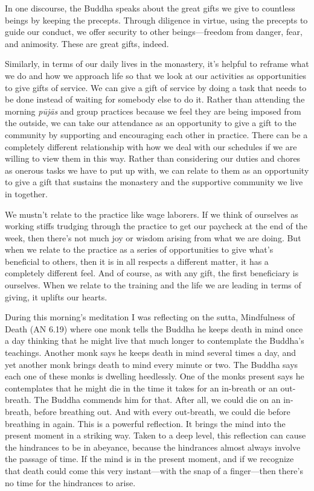
In one discourse, the Buddha speaks about the great gifts we give to 
countless beings by keeping the precepts. Through diligence in virtue, 
using the precepts to guide our conduct, we offer security to other 
beings---freedom from danger, fear, and animosity. These are great 
gifts, indeed.

Similarly, in terms of our daily lives in the monastery, it's helpful 
to reframe what we do and how we approach life so that we look at our 
activities as opportunities to give gifts of service. We can give a 
gift of service by doing a task that needs to be done instead of 
waiting for somebody else to do it. Rather than attending the morning 
\emph{pūjās} and group practices because we feel they are being 
imposed from the outside, we can take our attendance as an opportunity 
to give a gift to the community by supporting and encouraging each 
other in practice. There can be a completely different relationship 
with how we deal with our schedules if we are willing to view them in 
this way. Rather than considering our duties and chores as onerous 
tasks we have to put up with, we can relate to them as an opportunity 
to give a gift that sustains the monastery and the supportive community 
we live in together.

We mustn't relate to the practice like wage laborers. If we think of 
ourselves as working stiffs trudging through the practice to get our 
paycheck at the end of the week, then there's not much joy or wisdom 
arising from what we are doing. But when we relate to the practice as a 
series of opportunities to give what's beneficial to others, then it is 
in all respects a different matter, it has a completely different feel. 
And of course, as with any gift, the first beneficiary is ourselves. 
When we relate to the training and the life we are leading in terms of 
giving, it uplifts our hearts.


During this morning's meditation I was reflecting on the sutta, 
Mindfulness of Death (AN 6.19) where one monk tells the Buddha he keeps 
death in mind once a day thinking that he might live that much longer 
to contemplate the Buddha's teachings. Another monk says he keeps death 
in mind several times a day, and yet another monk brings death to mind 
every minute or two. The Buddha says each one of these monks is 
dwelling heedlessly. One of the monks present says he contemplates that 
he might die in the time it takes for an in-breath or an out-breath. 
The Buddha commends him for that. After all, we could die on an 
in-breath, before breathing out. And with every out-breath, we could 
die before breathing in again. This is a powerful reflection. It brings 
the mind into the present moment in a striking way. Taken to a deep 
level, this reflection can cause the hindrances to be in abeyance, 
because the hindrances almost always involve the passage of time. If 
the mind is in the present moment, and if we recognize that death could 
come this very instant---with the snap of a finger---then there's no 
time for the hindrances to arise.

